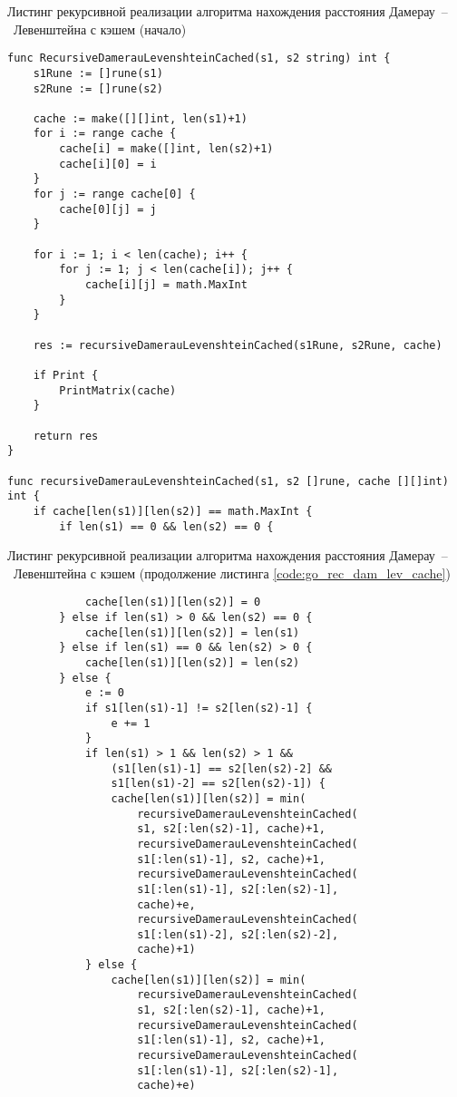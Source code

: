 \begin{code}
\caption{Листинг рекурсивной реализации алгоритма нахождения расстояния Дамерау~--~Левенштейна с кэшем (начало)}
\label{code:go_rec_dam_lev_cache}

\begin{verbatim}
func RecursiveDamerauLevenshteinCached(s1, s2 string) int {
	s1Rune := []rune(s1)
	s2Rune := []rune(s2)

	cache := make([][]int, len(s1)+1)
	for i := range cache {
		cache[i] = make([]int, len(s2)+1)
		cache[i][0] = i
	}
	for j := range cache[0] {
		cache[0][j] = j
	}

	for i := 1; i < len(cache); i++ {
		for j := 1; j < len(cache[i]); j++ {
			cache[i][j] = math.MaxInt
		}
	}

	res := recursiveDamerauLevenshteinCached(s1Rune, s2Rune, cache)

	if Print {
		PrintMatrix(cache)
	}

	return res
}

func recursiveDamerauLevenshteinCached(s1, s2 []rune, cache [][]int) int {
	if cache[len(s1)][len(s2)] == math.MaxInt {
		if len(s1) == 0 && len(s2) == 0 {
\end{verbatim}
\end{code}

\begin{code}
\caption{Листинг рекурсивной реализации алгоритма нахождения расстояния Дамерау~--~Левенштейна с кэшем (продолжение листинга \ref{code:go_rec_dam_lev_cache})}
\label{code:go_rec_dam_lev_cache2}

\begin{verbatim}
			cache[len(s1)][len(s2)] = 0
		} else if len(s1) > 0 && len(s2) == 0 {
			cache[len(s1)][len(s2)] = len(s1)
		} else if len(s1) == 0 && len(s2) > 0 {
			cache[len(s1)][len(s2)] = len(s2)
		} else {
			e := 0
			if s1[len(s1)-1] != s2[len(s2)-1] {
				e += 1
			}
			if len(s1) > 1 && len(s2) > 1 &&
				(s1[len(s1)-1] == s2[len(s2)-2] && 
				s1[len(s1)-2] == s2[len(s2)-1]) {
				cache[len(s1)][len(s2)] = min(
				    recursiveDamerauLevenshteinCached(
				    s1, s2[:len(s2)-1], cache)+1,
					recursiveDamerauLevenshteinCached(
					s1[:len(s1)-1], s2, cache)+1,
					recursiveDamerauLevenshteinCached(
					s1[:len(s1)-1], s2[:len(s2)-1], 
					cache)+e,
					recursiveDamerauLevenshteinCached(
					s1[:len(s1)-2], s2[:len(s2)-2], 
					cache)+1)
			} else {
				cache[len(s1)][len(s2)] = min(
				    recursiveDamerauLevenshteinCached(
				    s1, s2[:len(s2)-1], cache)+1,
					recursiveDamerauLevenshteinCached(
					s1[:len(s1)-1], s2, cache)+1,
					recursiveDamerauLevenshteinCached(
					s1[:len(s1)-1], s2[:len(s2)-1], 
					cache)+e)
\end{verbatim}
\end{code}

